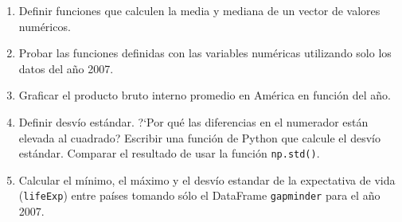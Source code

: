 \documentclass[a4paper,11pt]{article}
\theoremstyle{definition}
\begin{document}
\begin{enumerate}[resume]
\item Definir funciones que calculen la media y mediana de un vector de valores numéricos.

\item Probar las funciones definidas con las variables numéricas utilizando solo los datos del año 2007.

\item Graficar el producto bruto interno promedio en América en función del año.

\item Definir desv\'io est\'andar. ?`Por qu\'e las diferencias en el numerador est\'an elevada al cuadrado? Escribir una funci\'on de Python que calcule el desv\'io est\'andar. Comparar el resultado de usar la funci\'on \lstinline{np.std()}.

\item Calcular el mínimo, el máximo y el desv\'io estandar de la expectativa de vida (\lstinline{lifeExp}) entre pa\'ises tomando s\'olo el DataFrame \lstinline{gapminder} para el a\~no 2007.
\end{enumerate}

%
%
%
%
\end{document}

